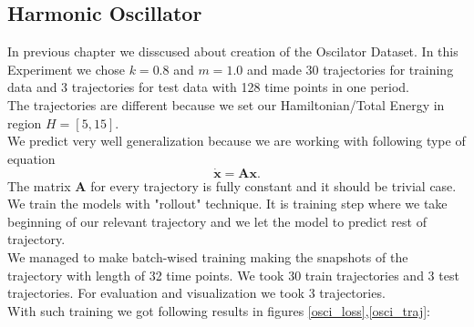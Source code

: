 \subsection{Harmonic Oscillator}
In previous chapter we disscused about creation of the Oscilator Dataset.
In this Experiment we chose $k=0.8$ and $m=1.0$ and made 30 trajectories for training data and 3 trajectories for test data with 128 time points in one period.\\
The trajectories are different because we set our Hamiltonian/Total Energy in region $H=[5,15]$.\\ We predict very well generalization because we are working with following type of equation\begin{equation}
	\dot{\mathbf{x}} = \mathbf{A}\mathbf{x}.
\end{equation} The matrix $\mathbf{A}$ for every trajectory is fully constant and it should be trivial case.\\
We train the models with "rollout" technique. It is training step where we take beginning of our relevant trajectory and we let the model to predict rest of trajectory.\\ 
We managed to make batch-wised training making the snapshots of the trajectory with length of 32 time points. We took 30 train trajectories and 3 test trajectories. For evaluation and visualization we took 3 trajectories. \\
With such training we got following results in figures \ref{osci_loss},\ref{osci_traj}: 

